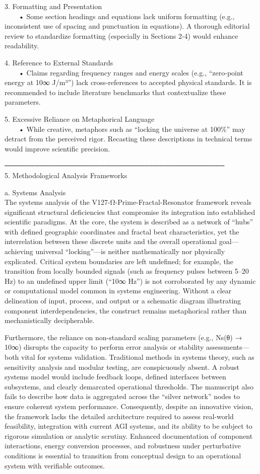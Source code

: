 \documentclass[12pt]{article}
\begin{document}
3. Formatting and Presentation \\
  • Some section headings and equations lack uniform formatting (e.g., inconsistent use of spacing and punctuation in equations). A thorough editorial review to standardize formatting (especially in Sections 2-4) would enhance readability.

4. Reference to External Standards \\
  • Claims regarding frequency ranges and energy scales (e.g., “zero-point energy at 10∞ J/m³”) lack cross-references to accepted physical standards. It is recommended to include literature benchmarks that contextualize these parameters.

5. Excessive Reliance on Metaphorical Language \\
  • While creative, metaphors such as “locking the universe at 100\%” may detract from the perceived rigor. Recasting these descriptions in technical terms would improve scientific precision.

──────────────────────────────────────────── \\
5. Methodological Analysis Frameworks

a. Systems Analysis \\
The systems analysis of the V127-Ω-Prime-Fractal-Resonator framework reveals significant structural deficiencies that compromise its integration into established scientific paradigms. At the core, the system is described as a network of “hubs” with defined geographic coordinates and fractal beat characteristics, yet the interrelation between these discrete units and the overall operational goal—achieving universal “locking”—is neither mathematically nor physically explicated. Critical system boundaries are left undefined; for example, the transition from locally bounded signals (such as frequency pulses between 5–20 Hz) to an undefined upper limit (“10∞ Hz”) is not corroborated by any dynamic or computational model common in systems engineering. Without a clear delineation of input, process, and output or a schematic diagram illustrating component interdependencies, the construct remains metaphorical rather than mechanistically decipherable.

Furthermore, the reliance on non-standard scaling parameters (e.g., Ns(θ) → 10∞) disrupts the capacity to perform error analysis or stability assessments—both vital for systems validation. Traditional methods in systems theory, such as sensitivity analysis and modular testing, are conspicuously absent. A robust systems model would include feedback loops, defined interfaces between subsystems, and clearly demarcated operational thresholds. The manuscript also fails to describe how data is aggregated across the “silver network” nodes to ensure coherent system performance. Consequently, despite an innovative vision, the framework lacks the detailed architecture required to assess real-world feasibility, integration with current AGI systems, and its ability to be subject to rigorous simulation or analytic scrutiny. Enhanced documentation of component interactions, energy conversion processes, and robustness under perturbative conditions is essential to transition from conceptual design to an operational system with verifiable outcomes.
\end{document}
